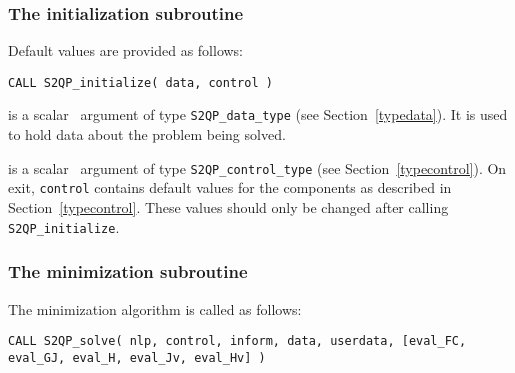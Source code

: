 \documentclass{galahad}
\newcommand{\packagename}{S2QP}
\begin{document}

\subsubsection{The initialization subroutine}\label{subinit}
 Default values are provided as follows:
\vspace*{1mm}

\hspace{8mm}
{\tt CALL \packagename\_initialize( data, control )}

\vspace*{-3mm}
\begin{description}

 is a scalar \intentinout\ argument of type 
{\tt \packagename\_data\_type}
(see Section~\ref{typedata}). It is used to hold data about the problem being 
solved.

 is a scalar \intentout\ argument of type 
{\tt \packagename\_control\_type}
(see Section~\ref{typecontrol}). 
On exit, {\tt control} contains default values for the components as
described in Section~\ref{typecontrol}.
These values should only be changed after calling 
{\tt \packagename\_initialize}.

\end{description}


\subsubsection{The minimization subroutine}
The minimization algorithm is called as follows:
\vspace*{1mm}

\hspace{8mm}
{\tt CALL \packagename\_solve( nlp, control, inform, data, userdata,
          [eval\_FC, eval\_GJ, eval\_H, eval\_Jv, eval\_Hv] )}
\end{document}
